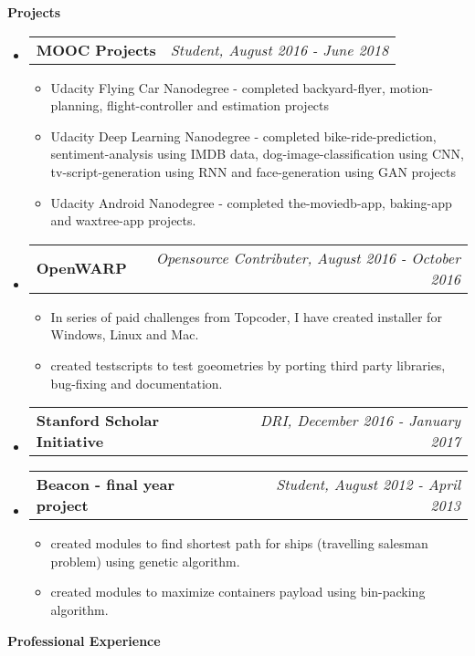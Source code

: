 \documentclass[letterpaper,11pt]{article}
\makeatletter
\newcommand{\resheading}[1]{{\large \colorbox{mygrey}{\begin{minipage}{\textwidth}{\textbf{#1 \vphantom{p\^{E}}}}\end{minipage}}}}
\newcommand{\ressubheading}[4]{
\begin{tabular*}{7.0in}{l@{\extracolsep{\fill}}r}
		\textbf{#1} & \textit{#4} \\
\end{tabular*}\vspace{-6pt}}
\makeatother
\begin{document}
\resheading{Projects}
\begin{itemize}

\item
	\ressubheading{MOOC Projects}{Online}{Crowdsourcing}{Student, August 2016 - June 2018}
	\begin{itemize}
	\item Udacity Flying Car Nanodegree - completed backyard-flyer, motion-planning, flight-controller and estimation projects
	\item Udacity Deep Learning Nanodegree - completed bike-ride-prediction, sentiment-analysis using IMDB data, dog-image-classification using CNN, tv-script-generation using RNN and face-generation using GAN projects
	\item Udacity Android Nanodegree - completed the-moviedb-app, baking-app and waxtree-app	projects.
	\end{itemize}	


\item
	\ressubheading{OpenWARP}{Opensource}{Crowdsourcing}{ Opensource Contributer, August 2016 - October 2016}
	\begin{itemize}
	\item In series of paid challenges from Topcoder, I have created installer for Windows, Linux and Mac. 
	\item created testscripts to test goeometries by porting third party libraries, bug-fixing and documentation.
	\end{itemize}


\item
	\ressubheading{Stanford Scholar Initiative}{Online}{Crowdsourcing}{DRI, December 2016 - January 2017}	
\item
	\ressubheading{Beacon - final year project}{APIIT,IN}{Student}{Student, August 2012 - April 2013}
	\begin{itemize}
	\item created modules to find shortest path for ships (travelling salesman problem) using genetic algorithm.
	\item created modules to maximize containers payload using bin-packing algorithm.
	\end{itemize}
\end{itemize}



\resheading{Professional Experience}
\end{document}
